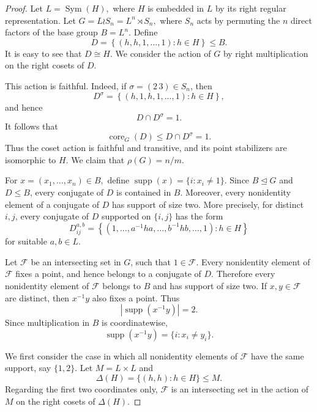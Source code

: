 \documentclass[11pt]{article}
\begin{document}
\begin{proof}
Let
\(
L=\operatorname{Sym}(H),
\)
where \(H\) is embedded in \(L\) by its right regular representation.
Let
\(
G=L\wr S_n=L^n\rtimes S_n,
\)
where \(S_n\) acts by permuting the \(n\) direct factors of the base
group
\(
B=L^n.
\)
Define
\[
D=
\left\{
(h,h,1,\ldots,1):h\in H
\right\}\leq B.
\]
It is easy to see that 
$D\cong H$.
We consider the action of \(G\) by right multiplication on the right
cosets of \(D\).

This action is faithful. Indeed, if
\(\sigma=(2\,3)\in S_n\), then
\[
D^\sigma
=
\left\{
(h,1,h,1,\ldots,1):h\in H
\right\},
\]
and hence
\[
D\cap D^\sigma=1.
\]
It follows that
\[
\operatorname{core}_G(D)
\leq D\cap D^\sigma=1.
\]
Thus the coset action is faithful and transitive, and its point
stabilizers are isomorphic to \(H\).
We claim that
$\rho(G)=n/m$.


For
\(
x=(x_1,\ldots,x_n)\in B,
\)
define
\(
\operatorname{supp}(x)
=
\{i:x_i\neq 1\}.
\)
Since \(B\unlhd G\) and \(D\leq B\), every conjugate of \(D\) is
contained in \(B\). Moreover, every nonidentity element of a
conjugate of \(D\) has support of size two.
More precisely, for distinct \(i,j\), every conjugate of \(D\)
supported on \(\{i,j\}\) has the form
\[
D_{ij}^{a,b}
=
\left\{
(1,\ldots,a^{-1}ha,\ldots,b^{-1}hb,\ldots,1):
h\in H
\right\}
\]
for suitable \(a,b\in L\).

Let \(\mathcal{F}\) be an intersecting set in \(G\), such that
\(1\in\mathcal{F}\). Every nonidentity element of \(\mathcal{F}\)
fixes a point, and hence belongs to a conjugate of \(D\). Therefore
every nonidentity element of \(\mathcal{F}\) belongs to \(B\) and has
support of size two.
If \(x,y\in\mathcal{F}\) are distinct, then \(x^{-1}y\) also fixes a
point. Thus
\begin{equation}\label{eq:supp 2}
\left|\operatorname{supp}(x^{-1}y)\right|=2.
\end{equation}
Since multiplication in \(B\) is coordinatewise,
\begin{equation}\label{eq:supp x y}
\operatorname{supp}(x^{-1}y)
=
\{i:x_i\neq y_i\}.
\end{equation}

We first consider the case in which all nonidentity elements of
\(\mathcal{F}\) have the same support, say \(\{1,2\}\). Let
\(
M=L\times L
\)
and
\[
\Delta(H)=\{(h,h):h\in H\}\leq M.
\]
Regarding the first two coordinates only, \(\mathcal{F}\) is an
intersecting set in the action of \(M\) on the right cosets of
\(\Delta(H)\).


\end{proof}
\end{document}
